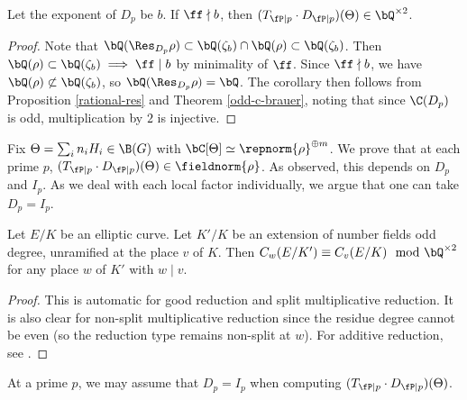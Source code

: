 \begin{cor}\label{rational-res-2}
    Let the exponent of $D_p$ be $b$. If $\ff \nmid b$, then $(T_{\fP \mid p} \cdot D_{\fP \mid p})(\Theta) \in \bQ^{\times 2}$.
\end{cor}

\begin{proof}
    Note that $\bQ(\Res_{D_p}{\rho}) \subset \bQ(\zeta_b) \cap \bQ(\rho) \subset \bQ(\zeta_b)$. Then $\bQ(\rho) \subset \bQ(\zeta_b) \implies \ff \mid b$ by minimality of $\ff$. Since $\ff \nmid b$, we have $\bQ(\rho) \not\subset \bQ(\zeta_b)$, so $\bQ(\Res_{D_p} \rho) = \bQ$. The corollary then follows from Proposition \ref{rational-res} and Theorem \ref{odd-c-brauer}, noting that since $\C(D_p)$ is odd, multiplication by $2$ is injective. 
\end{proof}

Fix $\Theta = \sum_i n_i H_i \in \B(G)$ with $\bC[\Theta] \simeq \repnorm{\rho}^{\oplus m}$. We prove that at each prime $p$, $(T_{\fP \mid p}\cdot D_{\fP \mid p})(\Theta) \in \fieldnorm{\rho}$.  As observed, this depends on $D_p$ and $I_p$. As we deal with each local factor individually, we argue that one can take $D_p = I_p$.

\begin{lemma}\label{tam-up-to-square}
    Let $E / K$ be an elliptic curve. Let $K' / K$ be an extension of number fields odd degree, unramified at the place $v$ of $K$. Then $C_w(E / K') \equiv C_v(E / K) \mod \bQ^{\times 2}$ for any place $w$ of $K'$ with $ w \mid v$. 
\end{lemma}

\begin{proof}
This is automatic for good reduction and split multiplicative reduction. It is also clear for non-split multiplicative reduction since the residue degree cannot be even (so the reduction type remains non-split at $w$). For additive reduction, see \cite[Lemma 3.12]{reg-const}.
\end{proof}

\begin{lemma}\label{DeqI}
    At a prime $p$, we may assume that $D_p = I_p$ when computing $(T_{\fP \mid p} \cdot D_{\fP \mid p})(\Theta)$. 
\end{lemma}

